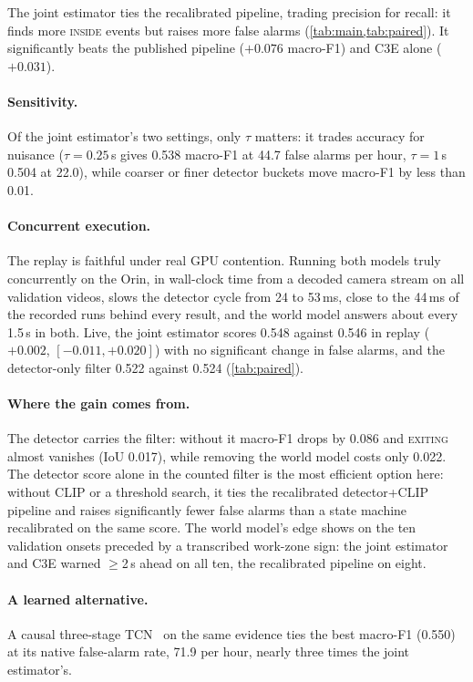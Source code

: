 \documentclass[conference]{IEEEtran}
\let\oldtextsc\textsc
\renewcommand{\textsc}[1]{\mbox{\oldtextsc{#1}}}
\begin{document}
The joint estimator ties the recalibrated pipeline, trading precision for recall: it finds more \textsc{inside} events but raises more false alarms (\cref{tab:main,tab:paired}).  It significantly beats the published pipeline ($+0.076$ macro-F1) and C3E alone ($+0.031$).

\paragraph{Sensitivity.}  Of the joint estimator's two settings, only $\tau$ matters: it trades accuracy for nuisance ($\tau=0.25$\,s gives 0.538 macro-F1 at 44.7 false alarms per hour, $\tau=1$\,s 0.504 at 22.0), while coarser or finer detector buckets move macro-F1 by less than 0.01.

\paragraph{Concurrent execution.}  The replay is faithful under real GPU contention.  Running both models truly concurrently on the Orin, in wall-clock time from a decoded camera stream on all validation videos, slows the detector cycle from 24 to 53\,ms, close to the 44\,ms of the recorded runs behind every result, and the world model answers about every 1.5\,s in both.  Live, the joint estimator scores 0.548 against 0.546 in replay ($+0.002$, $[-0.011,+0.020]$) with no significant change in false alarms, and the detector-only filter 0.522 against 0.524 (\cref{tab:paired}).

\paragraph{Where the gain comes from.}  The detector carries the filter: without it macro-F1 drops by 0.086 and \textsc{exiting} almost vanishes (IoU 0.017), while removing the world model costs only 0.022.  The detector score alone in the counted filter is the most efficient option here: without CLIP or a threshold search, it ties the recalibrated detector+CLIP pipeline and raises significantly fewer false alarms than a state machine recalibrated on the same score.  The world model's edge shows on the ten validation onsets preceded by a transcribed work-zone sign: the joint estimator and C3E warned $\geq$2\,s ahead on all ten, the recalibrated pipeline on eight.

\paragraph{A learned alternative.}  A causal three-stage TCN~\cite{farha2019mstcn} on the same evidence ties the best macro-F1 (0.550) at its native false-alarm rate, 71.9 per hour, nearly three times the joint estimator's.
\end{document}
